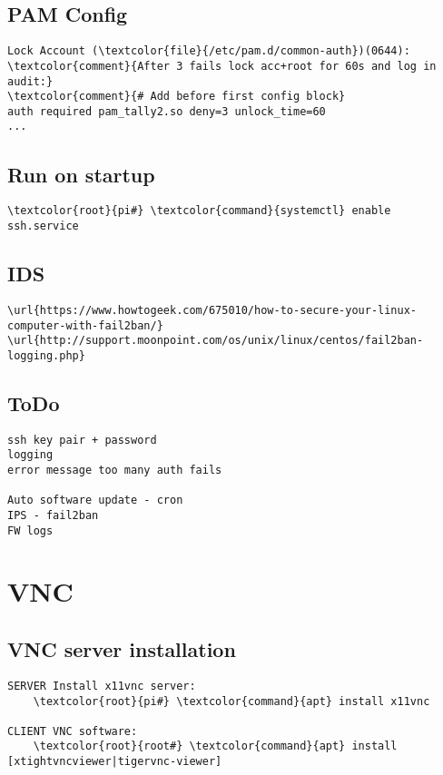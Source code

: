 \documentclass[10pt, a4paper, onecolumn, openany]{book} %
\begin{document}
\subsection{PAM Config}
\begin{Verbatim}[commandchars=\\\{\}]
Lock Account (\textcolor{file}{/etc/pam.d/common-auth})(0644):
\textcolor{comment}{After 3 fails lock acc+root for 60s and log in audit:}
\textcolor{comment}{# Add before first config block}
auth required pam_tally2.so deny=3 unlock_time=60
...
\end{Verbatim}
\subsection{Run on startup}
\begin{Verbatim}[commandchars=\\\{\}]
    \textcolor{root}{pi#} \textcolor{command}{systemctl} enable ssh.service
\end{Verbatim}

\subsection{IDS}
\begin{Verbatim}[commandchars=\\\{\}]
\url{https://www.howtogeek.com/675010/how-to-secure-your-linux-computer-with-fail2ban/}
\url{http://support.moonpoint.com/os/unix/linux/centos/fail2ban-logging.php}
\end{Verbatim}


\subsection{ToDo}
\begin{Verbatim}[commandchars=\\\{\}]
ssh key pair + password
logging
error message too many auth fails

Auto software update - cron
IPS - fail2ban
FW logs
\end{Verbatim}


\section{VNC}
\subsection{VNC server installation}
\begin{Verbatim}[commandchars=\\\{\}]
SERVER Install x11vnc server:
    \textcolor{root}{pi#} \textcolor{command}{apt} install x11vnc

CLIENT VNC software:
    \textcolor{root}{root#} \textcolor{command}{apt} install [xtightvncviewer|tigervnc-viewer]
\end{Verbatim}
\end{document}
